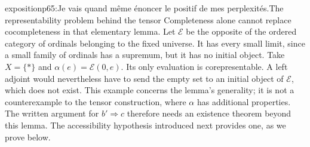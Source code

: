 \begin{dcomment}{exposition}{p65:Je vais quand même énoncer le positif de mes perplexités.}{The representability problem behind the tensor}
Completeness alone cannot replace cocompleteness in that elementary lemma.  Let $\mathcal E$ be the opposite of the ordered category of ordinals belonging to the fixed universe.  It has every small limit, since a small family of ordinals has a supremum, but it has no initial object.  Take $X=\{*\}$ and $\alpha(e)=\mathcal E(0,e)$.  Its only evaluation is corepresentable.  A left adjoint would nevertheless have to send the empty set to an initial object of $\mathcal E$, which does not exist.  This example concerns the lemma's generality; it is not a counterexample to the tensor construction, where $\alpha$ has additional properties.  The written argument for $b'\Rightarrow c$ therefore needs an existence theorem beyond this lemma.  The accessibility hypothesis introduced next provides one, as we prove below.
\end{dcomment}

